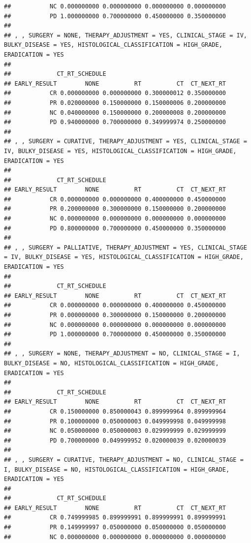 \documentclass[]{article}
\begin{document}
\begin{verbatim}
##           NC 0.000000000 0.000000000 0.000000000 0.000000000
##           PD 1.000000000 0.700000000 0.450000000 0.350000000
## 
## , , SURGERY = NONE, THERAPY_ADJUSTMENT = YES, CLINICAL_STAGE = IV, BULKY_DISEASE = YES, HISTOLOGICAL_CLASSIFICATION = HIGH_GRADE, ERADICATION = YES
## 
##             CT_RT_SCHEDULE
## EARLY_RESULT        NONE          RT          CT  CT_NEXT_RT
##           CR 0.000000000 0.000000000 0.300000012 0.350000000
##           PR 0.020000000 0.150000000 0.150000006 0.200000000
##           NC 0.040000000 0.150000000 0.200000008 0.200000000
##           PD 0.940000000 0.700000000 0.349999974 0.250000000
## 
## , , SURGERY = CURATIVE, THERAPY_ADJUSTMENT = YES, CLINICAL_STAGE = IV, BULKY_DISEASE = YES, HISTOLOGICAL_CLASSIFICATION = HIGH_GRADE, ERADICATION = YES
## 
##             CT_RT_SCHEDULE
## EARLY_RESULT        NONE          RT          CT  CT_NEXT_RT
##           CR 0.000000000 0.000000000 0.400000000 0.450000000
##           PR 0.200000000 0.300000000 0.150000000 0.200000000
##           NC 0.000000000 0.000000000 0.000000000 0.000000000
##           PD 0.800000000 0.700000000 0.450000000 0.350000000
## 
## , , SURGERY = PALLIATIVE, THERAPY_ADJUSTMENT = YES, CLINICAL_STAGE = IV, BULKY_DISEASE = YES, HISTOLOGICAL_CLASSIFICATION = HIGH_GRADE, ERADICATION = YES
## 
##             CT_RT_SCHEDULE
## EARLY_RESULT        NONE          RT          CT  CT_NEXT_RT
##           CR 0.000000000 0.000000000 0.400000000 0.450000000
##           PR 0.000000000 0.300000000 0.150000000 0.200000000
##           NC 0.000000000 0.000000000 0.000000000 0.000000000
##           PD 1.000000000 0.700000000 0.450000000 0.350000000
## 
## , , SURGERY = NONE, THERAPY_ADJUSTMENT = NO, CLINICAL_STAGE = I, BULKY_DISEASE = NO, HISTOLOGICAL_CLASSIFICATION = HIGH_GRADE, ERADICATION = YES
## 
##             CT_RT_SCHEDULE
## EARLY_RESULT        NONE          RT          CT  CT_NEXT_RT
##           CR 0.150000000 0.850000043 0.899999964 0.899999964
##           PR 0.100000000 0.050000003 0.049999998 0.049999998
##           NC 0.050000000 0.050000003 0.029999999 0.029999999
##           PD 0.700000000 0.049999952 0.020000039 0.020000039
## 
## , , SURGERY = CURATIVE, THERAPY_ADJUSTMENT = NO, CLINICAL_STAGE = I, BULKY_DISEASE = NO, HISTOLOGICAL_CLASSIFICATION = HIGH_GRADE, ERADICATION = YES
## 
##             CT_RT_SCHEDULE
## EARLY_RESULT        NONE          RT          CT  CT_NEXT_RT
##           CR 0.749999985 0.899999991 0.899999991 0.899999991
##           PR 0.149999997 0.050000000 0.050000000 0.050000000
##           NC 0.000000000 0.000000000 0.000000000 0.000000000

\end{verbatim}
\end{document}
